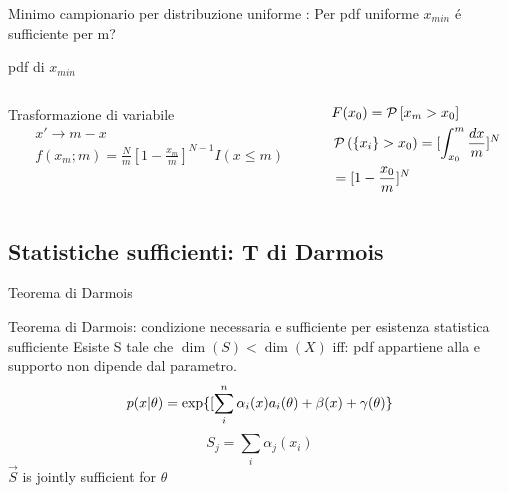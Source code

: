\documentclass[asd-beamer.tex]{subfiles}
\begin{document}
\begin{wordonframe}{Minimo campionario per distribuzione uniforme}
: Per pdf uniforme $x_{min}$ \'e sufficiente per m?
\end{wordonframe}

\begin{wordonframe}{}
pdf di $x_{min}$
\begin{columns}[T]
\begin{column}{0.5\textwidth}
Trasformazione di variabile
\begin{align*}
&x'\to m-x\\
&f(x_m;m)=\frac{N}{m}[1-\frac{x_m}{m}]^{N-1}I(x\leq m)
\end{align*}
\end{column}
\begin{column}{0.5\textwidth}
\begin{align*}
&F(x_0)=\operatorname{\mathcal{P}}{[x_m>x_0]}\\
&\operatorname{\mathcal{P}}{(\{x_i\}>x_0)}=[\int_{x_0}^m\frac{dx}{m}]^N\\
&=[1-\frac{x_0}{m}]^N
\end{align*}
\end{column}
\end{columns}
\end{wordonframe}

\subsection{Statistiche sufficienti: T di Darmois}

\begin{frame}{Teorema di Darmois}\frameintoc
\begin{block}{Teorema di Darmois: condizione necessaria e sufficiente per esistenza statistica sufficiente}
Esiste S tale che $\dim{(S)}<\dim{(X)}$ iff: pdf appartiene alla  e supporto non dipende dal parametro.
\begin{equation*}
p(x|\theta)=\text{exp}\{[\sum_i^n\alpha_i(x)a_i(\theta)+\beta(x)+\gamma(\theta)\}
\end{equation*}
\begin{equation*}
S_j=\sum_i\alpha_j(x_i)
\end{equation*}
$\vec{S}$ is jointly sufficient for $\theta$
\end{block}
\end{frame}
\end{document}
